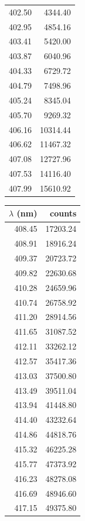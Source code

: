 \begin{table}[!h]
\begin{tabular}{rr}
          402.50 &   4344.40 \\
          402.95 &   4854.16 \\
          403.41 &   5420.00 \\
          403.87 &   6040.96 \\
          404.33 &   6729.72 \\
          404.79 &   7498.96 \\
          405.24 &   8345.04 \\
          405.70 &   9269.32 \\
          406.16 &  10314.44 \\
          406.62 &  11467.32 \\
          407.08 &  12727.96 \\
          407.53 &  14116.40 \\
          407.99 &  15610.92 \\
\bottomrule
\end{tabular}        
\begin{tabular}{rr}
\toprule
 $\lambda$ (nm) &    counts \\
\midrule
          408.45 &  17203.24 \\  
          408.91 &  18916.24 \\
          409.37 &  20723.72 \\
          409.82 &  22630.68 \\
          410.28 &  24659.96 \\
          410.74 &  26758.92 \\
          411.20 &  28914.56 \\
          411.65 &  31087.52 \\
          412.11 &  33262.12 \\
          412.57 &  35417.36 \\
          413.03 &  37500.80 \\
          413.49 &  39511.04 \\
          413.94 &  41448.80 \\
          414.40 &  43232.64 \\
          414.86 &  44818.76 \\
          415.32 &  46225.28 \\
          415.77 &  47373.92 \\
          416.23 &  48278.08 \\
          416.69 &  48946.60 \\
          417.15 &  49375.80 \\

\end{tabular}
\end{table}
